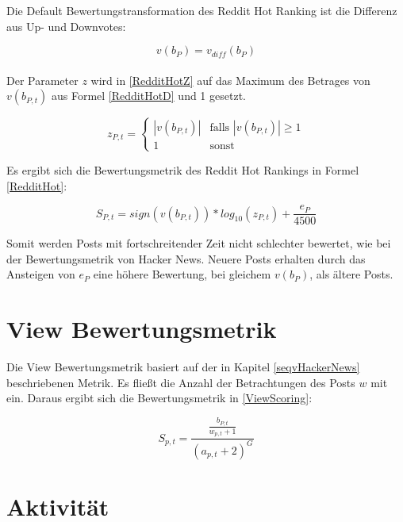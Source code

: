Die Default Bewertungstransformation des Reddit Hot Ranking ist die Differenz aus Up- und Downvotes:

\begin{equation}
\label{RedditHotD}
v(b_{P}) = v_{diff}(b_{P})
\end{equation}
\\
Der Parameter $z$ wird in \ref{RedditHotZ} auf das Maximum des Betrages von $v(b_{P,t})$ aus Formel \ref{RedditHotD} und 1 gesetzt.

\begin{equation}
\label{RedditHotZ}
z_{P,t}  = \begin{cases}
|v(b_{P,t})| &\text{falls $|v(b_{P,t})| \geq 1$}\\
1 &\text{sonst}
\end{cases}
\end{equation}

Es ergibt sich die Bewertungsmetrik des Reddit Hot Rankings in Formel \ref{RedditHot}:

\begin{equation}
\label{RedditHot}
S_{P,t} = sign(v(b_{P,t})) * log_{10}(z_{P,t}) + \frac{e_{P}}{4500}
\end{equation}

Somit werden Posts mit fortschreitender Zeit nicht schlechter bewertet, wie bei der Bewertungsmetrik von Hacker News. Neuere Posts erhalten durch das Ansteigen von $e_P$ eine höhere Bewertung, bei gleichem $v(b_P)$, als ältere Posts. 
 

\section{View Bewertungsmetrik}

Die View Bewertungsmetrik basiert auf der in Kapitel \ref{seqvHackerNews} beschriebenen Metrik. Es fließt die Anzahl der Betrachtungen des Posts $w$ mit ein. Daraus ergibt sich die Bewertungsmetrik in \ref{ViewScoring}:

\begin{equation}
\label{ViewScoring}
S_{p,t} = \frac{\frac{b_{P,t}}{w_{p,t} + 1}}{(a_{p,t} + 2)^{G}}
\end{equation}




\section{Aktivität}

